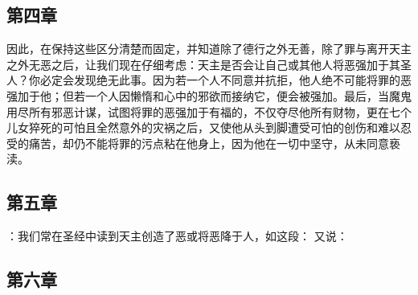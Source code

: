 
\subsection{第四章}

\par

因此，在保持这些区分清楚而固定，并知道除了德行之外无善，除了罪与离开天主之外无恶之后，让我们现在仔细考虑：天主是否会让自己或其他人将恶强加于其圣人？你必定会发现绝无此事。因为若一个人不同意并抗拒，他人绝不可能将罪的恶强加于他；但若一个人因懒惰和心中的邪欲而接纳它，便会被强加。最后，当魔鬼用尽所有邪恶计谋，试图将罪的恶强加于有福的，不仅夺尽他所有财物，更在七个儿女猝死的可怕且全然意外的灾祸之后，又使他从头到脚遭受可怕的创伤和难以忍受的痛苦，却仍不能将罪的污点粘在他身上，因为他在一切中坚守，从未同意亵渎。\par


\subsection{第五章}

\par

：我们常在圣经中读到天主创造了恶或将恶降于人，如这段： 又说：\par


\subsection{第六章}

\par

